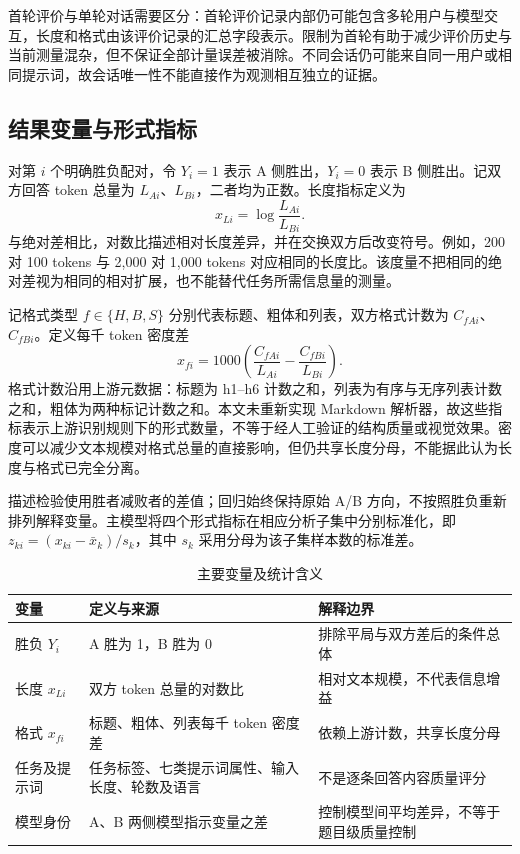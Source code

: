\documentclass[UTF8,11pt,a4paper,fontset=windows]{ctexart}
\numberwithin{equation}{section}
\begin{document}
首轮评价与单轮对话需要区分：首轮评价记录内部仍可能包含多轮用户与模型交互，长度和格式由该评价记录的汇总字段表示。限制为首轮有助于减少评价历史与当前测量混杂，但不保证全部计量误差被消除。不同会话仍可能来自同一用户或相同提示词，故会话唯一性不能直接作为观测相互独立的证据。

\subsection{结果变量与形式指标}
对第 $i$ 个明确胜负配对，令 $Y_i=1$ 表示 A 侧胜出，$Y_i=0$ 表示 B 侧胜出。记双方回答 token 总量为 $L_{Ai}$、$L_{Bi}$，二者均为正数。长度指标定义为
\begin{equation}
 x_{Li}=\log\frac{L_{Ai}}{L_{Bi}}.
\end{equation}
与绝对差相比，对数比描述相对长度差异，并在交换双方后改变符号。例如，200 对 100 tokens 与 2,000 对 1,000 tokens 对应相同的长度比。该度量不把相同的绝对差视为相同的相对扩展，也不能替代任务所需信息量的测量。

记格式类型 $f\in\{H,B,S\}$ 分别代表标题、粗体和列表，双方格式计数为 $C_{fAi}$、$C_{fBi}$。定义每千 token 密度差
\begin{equation}
 x_{fi}=1000\left(\frac{C_{fAi}}{L_{Ai}}-\frac{C_{fBi}}{L_{Bi}}\right).
\end{equation}
格式计数沿用上游元数据：标题为 h1--h6 计数之和，列表为有序与无序列表计数之和，粗体为两种标记计数之和。本文未重新实现 Markdown 解析器，故这些指标表示上游识别规则下的形式数量，不等于经人工验证的结构质量或视觉效果。密度可以减少文本规模对格式总量的直接影响，但仍共享长度分母，不能据此认为长度与格式已完全分离。

描述检验使用胜者减败者的差值；回归始终保持原始 A/B 方向，不按照胜负重新排列解释变量。主模型将四个形式指标在相应分析子集中分别标准化，即 $z_{ki}=(x_{ki}-\bar x_k)/s_k$，其中 $s_k$ 采用分母为该子集样本数的标准差。

\begin{table}[htbp]\centering\small
\caption{主要变量及统计含义}\label{tab:vars}
\begin{tabularx}{\textwidth}{p{2.8cm}Y Y}
\toprule
变量 & 定义与来源 & 解释边界\\
\midrule
胜负 $Y_i$ & A 胜为 1，B 胜为 0 & 排除平局与双方差后的条件总体\\
长度 $x_{Li}$ & 双方 token 总量的对数比 & 相对文本规模，不代表信息增益\\
格式 $x_{fi}$ & 标题、粗体、列表每千 token 密度差 & 依赖上游计数，共享长度分母\\
任务及提示词 & 任务标签、七类提示词属性、输入长度、轮数及语言 & 不是逐条回答内容质量评分\\
模型身份 & A、B 两侧模型指示变量之差 & 控制模型间平均差异，不等于题目级质量控制\\
\bottomrule
\end{tabularx}
\end{table}
\end{document}
